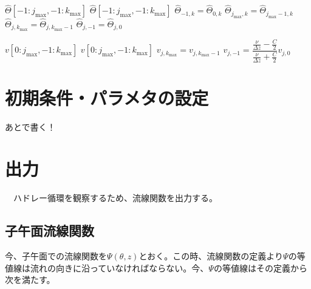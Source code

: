 \documentclass[ja=standard,xelatex]{bxjsarticle}
\newcommand{\vs}[1]{\vskip#1\baselineskip}
\newcommand{\bracketnormal}[1]{\left(#1\right)}
\begin{document}
\vs{0.5}

\begin{algorithm}[H]
  \caption*{\textbf{subroutine:} update\_boundary\_potential\_temp}
  \begin{algorithmic}[1]
    \Require $\hat{\Theta}[-1:j_\text{max},-1:k_\text{max}]$
    \Ensure $\hat{\Theta}[-1:j_\text{max},-1:k_\text{max}]$
    \Statex
    \State {}
    \State $\hat{\Theta}_{-1,k} = \hat{\Theta}_{0,k}$
    \State $\hat{\Theta}_{j_\text{max},k} = \hat{\Theta}_{j_\text{max}-1,k}$
    \EndDo
    \State {}
    \State $\hat{\Theta}_{j,k_\text{max}} = \hat{\Theta}_{j,k_\text{max}-1}$
    \State $\hat{\Theta}_{j,-1} = \hat{\Theta}_{j,0}$
    \EndDo
  \end{algorithmic}
\end{algorithm}

\vs{0.5}

\begin{algorithm}[H]
  \caption*{\textbf{subroutine:} update\_boundary\_v}
  \begin{algorithmic}[1]
    \Require $v[0:j_\text{max},-1:k_\text{max}]$
    \Ensure $v[0:j_\text{max},-1:k_\text{max}]$
    \Statex
    \State {}
    \State $v_{j,k_\text{max}} = v_{j,k_\text{max}-1}$
    \State $v_{j,-1} = \dfrac{\frac{\nu}{\Delta z}-\frac{C}{2}}{\frac{\nu}{\Delta z}+\frac{C}{2}}v_{j,0}$
    \EndDo
  \end{algorithmic}
\end{algorithm}

\section{初期条件・パラメタの設定}
{\color{red}あとで書く！}

\section{出力}
　ハドレー循環を観察するため、流線関数を出力する。

\subsection{子午面流線関数}
今、子午面での流線関数を$\Psi\bracketnormal{\theta,z}$とおく。この時、流線関数の定義より$\Psi$の等値線は流れの向きに沿っていなければならない。今、$\Psi$の等値線はその定義から次を満たす。
\end{document}
